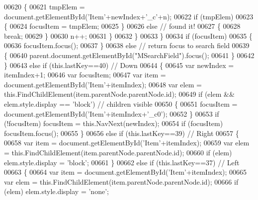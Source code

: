 \begin{DoxyCode}
00620             \{
00621               tmpElem = document.getElementById(\textcolor{stringliteral}{'Item'}+newIndex+\textcolor{stringliteral}{'\_c'}+n);
00622               \textcolor{keywordflow}{if} (tmpElem)
00623               \{
00624                 focusItem = tmpElem;
00625               \}
00626               \textcolor{keywordflow}{else} \textcolor{comment}{// found it!}
00627               \{
00628                 \textcolor{keywordflow}{break};
00629               \}
00630               n++;
00631             \}
00632           \}
00633         \}
00634         \textcolor{keywordflow}{if} (focusItem)
00635         \{
00636           focusItem.focus();
00637         \}
00638         \textcolor{keywordflow}{else} \textcolor{comment}{// return focus to search field}
00639         \{
00640            parent.document.getElementById(\textcolor{stringliteral}{"MSearchField"}).focus();
00641         \}
00642       \}
00643       \textcolor{keywordflow}{else} \textcolor{keywordflow}{if} (this.lastKey==40) \textcolor{comment}{// Down}
00644       \{
00645         var newIndex = itemIndex+1;
00646         var focusItem;
00647         var item = document.getElementById(\textcolor{stringliteral}{'Item'}+itemIndex);
00648         var elem = this.FindChildElement(item.parentNode.parentNode.id);
00649         \textcolor{keywordflow}{if} (elem && elem.style.display == \textcolor{stringliteral}{'block'}) \textcolor{comment}{// children visible}
00650         \{
00651           focusItem = document.getElementById(\textcolor{stringliteral}{'Item'}+itemIndex+\textcolor{stringliteral}{'\_c0'});
00652         \}
00653         \textcolor{keywordflow}{if} (!focusItem) focusItem = this.NavNext(newIndex);
00654         \textcolor{keywordflow}{if} (focusItem)  focusItem.focus();
00655       \}
00656       \textcolor{keywordflow}{else} \textcolor{keywordflow}{if} (this.lastKey==39) \textcolor{comment}{// Right}
00657       \{
00658         var item = document.getElementById(\textcolor{stringliteral}{'Item'}+itemIndex);
00659         var elem = this.FindChildElement(item.parentNode.parentNode.id);
00660         \textcolor{keywordflow}{if} (elem) elem.style.display = \textcolor{stringliteral}{'block'};
00661       \}
00662       \textcolor{keywordflow}{else} \textcolor{keywordflow}{if} (this.lastKey==37) \textcolor{comment}{// Left}
00663       \{
00664         var item = document.getElementById(\textcolor{stringliteral}{'Item'}+itemIndex);
00665         var elem = this.FindChildElement(item.parentNode.parentNode.id);
00666         \textcolor{keywordflow}{if} (elem) elem.style.display = \textcolor{stringliteral}{'none'};

\end{DoxyCode}
